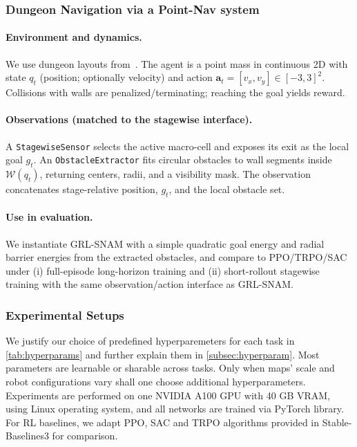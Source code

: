 \documentclass{article} %
\begin{document}
\subsubsection{ Dungeon Navigation via a Point-Nav system }
\label{subsubsec:dungeon_task}

\paragraph{Environment and dynamics.}
We use dungeon layouts from~\citet{liang2023context}. The agent is a point mass in continuous 2D with state $q_t$ (position; optionally velocity) and action $\mathbf{a}_t=[v_x,v_y]\in[-3,3]^2$. Collisions with walls are penalized/terminating; reaching the goal yields reward.

\paragraph{Observations (matched to the stagewise interface).}
A \texttt{StagewiseSensor} selects the active macro-cell and exposes its exit as the local goal $g_t$. An \texttt{ObstacleExtractor} fits circular obstacles to wall segments inside $\mathcal{W}(q_t)$, returning centers, radii, and a visibility mask. The observation concatenates stage-relative position, $g_t$, and the local obstacle set.

\paragraph{Use in evaluation.}
We instantiate GRL-SNAM with a simple quadratic goal energy and radial barrier energies from the extracted obstacles, and compare to PPO/TRPO/SAC under (i) full-episode long-horizon training and (ii) short-rollout stagewise training with the same observation/action interface as GRL-SNAM.

\subsubsection{Experimental Setups}

We justify our choice of predefined hyperparemeters for each task in \cref{tab:hyperparams} and further explain them in \ref{subsec:hyperparam}. Most parameters are learnable or sharable across tasks. Only when maps' scale and robot configurations vary shall one choose additional hyperparameters. Experiments are performed on one NVIDIA A100 GPU with 40 GB VRAM, using Linux operating system, and all networks are trained via PyTorch \citep{paszke2019pytorch} library. For RL baselines, we adapt PPO, SAC and TRPO algorithms provided in Stable-Baselines3 \citep{stable-baselines3} for comparison. 
\end{document}
